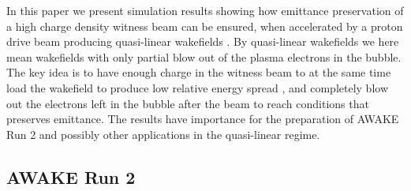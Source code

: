 \documentclass[aps,prstab,reprint,amsmath,amssymb,groupedaddress]{revtex4-1}
\begin{document}
In this paper we present simulation results showing how emittance preservation of a high charge density witness beam can
be ensured, when accelerated by a proton drive beam producing quasi-linear wakefields \cite{rosenzweig:2010}. By
quasi-linear wakefields we here mean wakefields with only partial blow out of the plasma electrons in the bubble.
The key idea is to have enough charge in the witness beam to at the same time load the wakefield to produce low
relative energy spread%
, and completely blow out the electrons left in the bubble after the beam to reach conditions that preserves emittance.
The results have importance for the preparation of AWAKE Run 2 and possibly other applications in the quasi-linear regime.




\subsection{AWAKE Run 2}\label{S:I:AWAKE}
\end{document}
